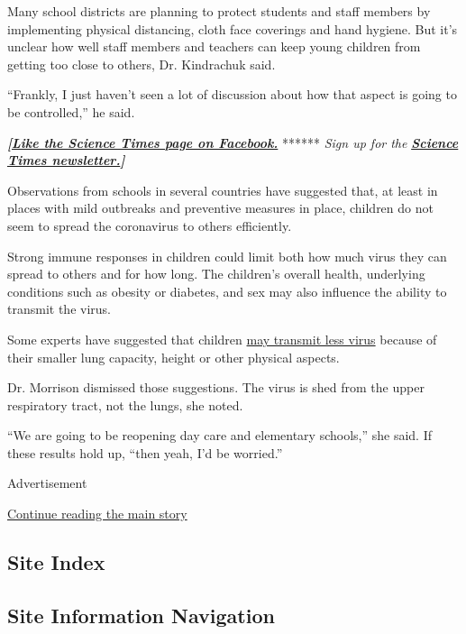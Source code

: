 Many school districts are planning to protect students and staff members
by implementing physical distancing, cloth face coverings and hand
hygiene. But it's unclear how well staff members and teachers can keep
young children from getting too close to others, Dr. Kindrachuk said.

``Frankly, I just haven't seen a lot of discussion about how that aspect
is going to be controlled,'' he said.

\textbf{\emph{{[}}\href{http://on.fb.me/1paTQ1h}{\emph{Like the Science
Times page on Facebook.}}} ****** \emph{\textbar{} Sign up for the}
\textbf{\href{http://nyti.ms/1MbHaRU}{\emph{Science Times
newsletter.}}\emph{{]}}}

Observations from schools in several countries have suggested that, at
least in places with mild outbreaks and preventive measures in place,
children do not seem to spread the coronavirus to others efficiently.

Strong immune responses in children could limit both how much virus they
can spread to others and for how long. The children's overall health,
underlying conditions such as obesity or diabetes, and sex may also
influence the ability to transmit the virus.

Some experts have suggested that children
\href{https://www.nytimes.com/2020/06/30/us/coronavirus-schools-reopening-guidelines-aap.html}{may
transmit less virus} because of their smaller lung capacity, height or
other physical aspects.

Dr. Morrison dismissed those suggestions. The virus is shed from the
upper respiratory tract, not the lungs, she noted.

``We are going to be reopening day care and elementary schools,'' she
said. If these results hold up, ``then yeah, I'd be worried.''

Advertisement

\protect\hyperlink{after-bottom}{Continue reading the main story}

\hypertarget{site-index}{%
\subsection{Site Index}\label{site-index}}

\hypertarget{site-information-navigation}{%
\subsection{Site Information
Navigation}\label{site-information-navigation}}

